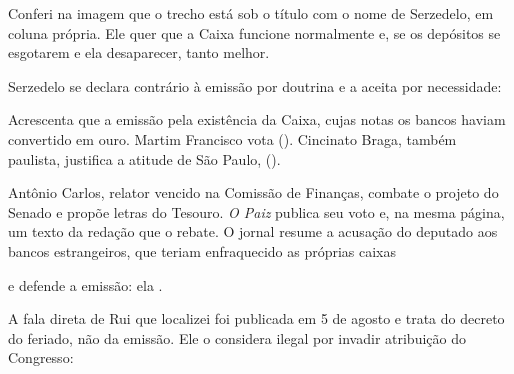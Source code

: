 

Conferi na imagem que o trecho está sob o título com o nome de Serzedelo, em
coluna própria. Ele quer que a Caixa funcione normalmente e, se os depósitos se
esgotarem e ela desaparecer, tanto melhor.


Serzedelo se declara contrário à emissão por doutrina e a aceita por
necessidade:


Acrescenta que a emissão  pela existência da Caixa, cujas notas os bancos haviam
convertido em ouro. Martim Francisco vota  ().
Cincinato Braga, também paulista, justifica a atitude de São Paulo,
().

Antônio Carlos, relator vencido na Comissão de Finanças, combate o projeto do
Senado e propõe letras do Tesouro. \textit{O Paiz} publica seu voto e, na mesma
página, um texto da redação que o rebate. O jornal resume a acusação do
deputado aos bancos estrangeiros, que teriam enfraquecido as próprias caixas


e defende a emissão: ela .


A fala direta de Rui que localizei foi publicada em 5 de agosto e trata do decreto do
feriado, não da emissão. Ele o considera ilegal por invadir atribuição do
Congresso:


